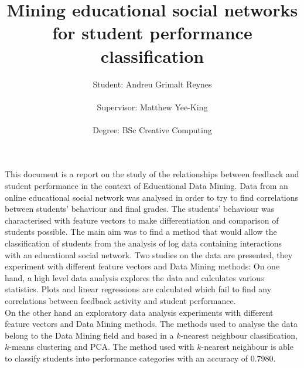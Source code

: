 \documentclass[11pt, oneside]{article}   	%
\title{Mining educational social networks for student performance classification}
\author{Student: Andreu Grimalt Reynes 
\\\\Supervisor: Matthew Yee-King
\\\\Degree: BSc Creative Computing}
\date{}							%
\begin{document}
\maketitle
\newpage
\abstract
\noindent
This document is a report on the study of the relationships between feedback and student performance in the context of Educational Data Mining. Data from an online educational social network was analysed in order to try to find correlations between students' behaviour and final grades. The students' behaviour was characterised with feature vectors to make differentiation and comparison of students possible. The main aim was to find a method that would allow the classification of students from the analysis of log data containing interactions with an educational social network.
Two studies on the data are presented, they experiment with different feature vectors and Data Mining methods: On one hand, a high level data analysis explores the data and calculates various statistics. Plots and linear regressions are calculated which fail to find any correlations between feedback activity and student performance.\\
On the other hand an exploratory data analysis experiments with different feature vectors and Data Mining methods. The methods used to analyse the data belong to the Data Mining field and based in a $k$-nearest neighbour classification, $k$-means clustering and PCA. The method used with $k$-nearest neighbour is able to classify students into performance categories with an accuracy of 0.7980.
\end{document}

